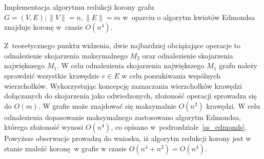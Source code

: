 \begin{theorem}
  Implementacja algorytmu redukcji korony grafu $G=(V,E); \|V\|=n,\|E\|=m$ 
  w~oparciu o algorytm kwiatów Edmondsa znajduje koronę w~czasie $O(n^{4})$.
\end{theorem}
\begin{bproof}
  Z~teoretycznego punktu widzenia, dwie najbardziej obciążające operacje to
  odnalezienie skojarzenia maksymalnego $M_2$ oraz odnalezienie skojarzenia
  największego $M_1$.
  W celu odnalezienia skojarzenia największego $M_1$ grafu należy
  sprawdzić wszystkie krawędzie $e\in E$ w celu poszukiwania wspólnych
  wierzchołków.
  Wykorzystując koncepcję zaznaczania wierzchołków krawędzi dołączanych do 
  skojarzenia jako odwiedzonych, złożoność operacji sprowadza się do $O(m)$.
  W grafie może znajdować się maksymalnie $O(n^{2})$ krawędzi.
  W celu odnalezienia dopasowanie maksymalnego zastosowano algorytm Edmondsa,
  którego złożoność wynosi $O(n^{4})$, co
  opisano w~podrozdziale~\ref{ss_edmonds}.
  Powyższe obserwacje prowadzą do wniosku, iż algorytm redukcji korony jest w
  stanie znaleźć koronę w grafie w czasie $O(n^{4} + n^{2})=O(n^{4})$.
\end{bproof}
